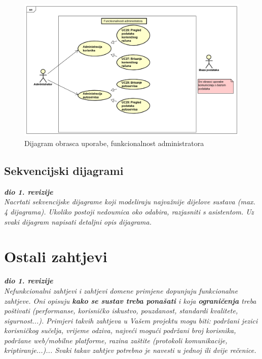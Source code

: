 \begin{figure}[H]
	\includegraphics[width=\linewidth]{dijagrami/diagram2.png}
	\centering
	\caption{Dijagram obrasca uporabe, funkcionalnost administratora}
	\label{fig:diagram2}
\end{figure}


\eject		

\subsection{Sekvencijski dijagrami}

\textbf{\textit{dio 1. revizije}}\\

\textit{Nacrtati sekvencijske dijagrame koji modeliraju najvažnije dijelove
	sustava (max. 4 dijagrama). Ukoliko postoji nedoumica oko odabira, razjasniti s
	asistentom. Uz svaki dijagram napisati detaljni opis dijagrama.}
\eject

\section{Ostali zahtjevi}

\textbf{\textit{dio 1. revizije}}\\

\textit{Nefunkcionalni zahtjevi i zahtjevi domene primjene dopunjuju
	funkcionalne zahtjeve. Oni opisuju \textbf{kako se sustav treba ponašati} i koja
	\textbf{ograničenja} treba poštivati (performanse, korisničko iskustvo,
	pouzdanost, standardi kvalitete, sigurnost...). Primjeri takvih zahtjeva u Vašem
	projektu mogu biti: podržani jezici korisničkog sučelja, vrijeme odziva, najveći
	mogući podržani broj korisnika, podržane web/mobilne platforme, razina zaštite
	(protokoli komunikacije, kriptiranje...)... Svaki takav zahtjev potrebno je
	navesti u jednoj ili dvije rečenice.}




 